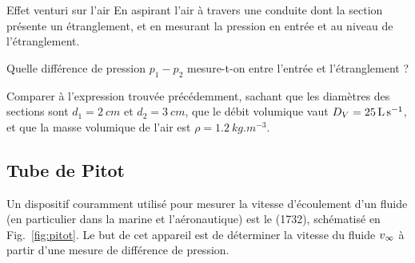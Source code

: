 \documentclass[12pt,fancy]{cours}
\begin{document}
\begin{experience}{Effet venturi sur l’air}\label{exp:}
En aspirant l’air à travers une conduite dont la section présente un étranglement, et en mesurant la pression en entrée et au niveau de l’étranglement.
\begin{quest}
  \item	Quelle différence de pression $p_1-p_2$ mesure-t-on entre l’entrée et l’étranglement ?
  \item Comparer à l’expression trouvée précédemment, sachant que les diamètres des sections sont $d_1=\SI{2}{cm}$ et $d_2=\SI{3}{cm}$, que le débit volumique vaut $D_V=\SI{25}{L.s^{-1}}$, et que la masse volumique de l’air est $\rho=\SI{1.2}{kg.m^{-3}}$. 
\end{quest}
\end{experience}

\subsection{Tube de Pitot}
\label{sec:tube_pitot}




Un dispositif couramment utilisé pour mesurer la vitesse d'écoulement d'un fluide (en particulier dans la marine et l'aéronautique) est le  (1732), schématisé en Fig.~\ref{fig:pitot}. Le but de cet appareil est de déterminer la vitesse du fluide $v_{\rm \infty}$ à partir d'une mesure de différence de pression.
\end{document}
